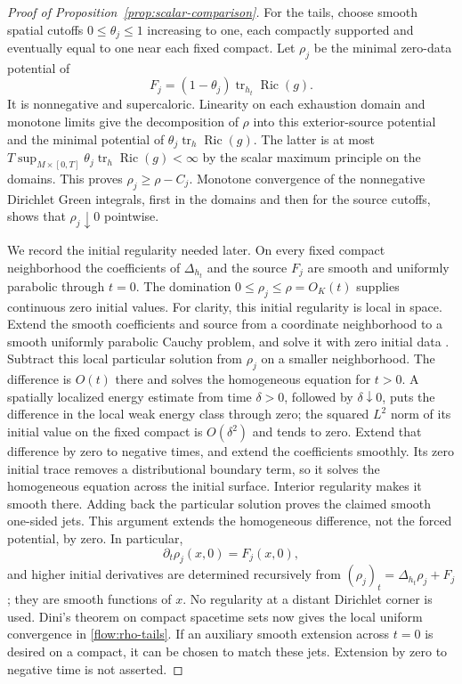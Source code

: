 \documentclass[11pt]{article}
\theoremstyle{definition}
\theoremstyle{remark}
\DeclareMathOperator{\Ric}{Ric}
\DeclareMathOperator{\tr}{tr}
\numberwithin{equation}{section}
\begin{document}
\begin{proof}[Proof of Proposition~\ref{prop:scalar-comparison}]
For the tails, choose smooth spatial cutoffs $0\le\theta_j\le1$
increasing to one, each compactly supported and eventually equal
to one near each fixed compact.  Let $\rho_j$ be the minimal
zero-data potential of
\[
 F_j=(1-\theta_j)\tr_{h_t}\Ric(g).
\]
It is nonnegative and supercaloric.  Linearity on each exhaustion
domain and monotone limits give the decomposition of $\rho$ into
this exterior-source potential and the minimal potential of
$\theta_j\tr_h\Ric(g)$.  The latter is at most
$T\sup_{M\times[0,T]}\theta_j\tr_h\Ric(g)<\infty$ by the scalar
maximum principle on the domains.  This proves
$\rho_j\ge\rho-C_j$.  Monotone convergence of the nonnegative
Dirichlet Green integrals, first in the domains and then for the
source cutoffs, shows that $\rho_j\downarrow0$ pointwise.

We record the initial regularity needed later.  On every fixed
compact neighborhood the coefficients of $\Delta_{h_t}$ and the
source $F_j$ are smooth and uniformly parabolic through $t=0$.
The domination $0\le\rho_j\le\rho=O_K(t)$ supplies continuous
zero initial values.
For clarity, this initial regularity is local in space.  Extend
the smooth coefficients and source from a coordinate neighborhood
to a smooth uniformly parabolic Cauchy problem, and solve it with
zero initial data \cite[Chapter~IV, Theorem~5.1]{LSU}.
Subtract this local particular solution from $\rho_j$ on a smaller
neighborhood.  The difference is $O(t)$ there and solves the
homogeneous equation for $t>0$.  A spatially localized energy
estimate from time $\delta>0$, followed by $\delta\downarrow0$,
puts the difference in the local weak energy class through zero;
the squared $L^2$ norm of its initial value on the fixed compact
is $O(\delta^2)$ and tends to zero.  Extend that difference by zero to
negative times, and extend the coefficients smoothly.  Its zero
initial trace removes a distributional boundary term, so it
solves the homogeneous equation across the initial surface.
Interior regularity \cite[Chapter~III, Theorem~12.1]{LSU} makes it
smooth there.  Adding back the particular solution proves the
claimed smooth one-sided jets.  This argument extends the
homogeneous difference, not the forced potential, by zero.
In particular,
\[
 \partial_t\rho_j(x,0)=F_j(x,0),
\]
and higher initial derivatives are determined recursively from
$(\rho_j)_t=\Delta_{h_t}\rho_j+F_j$; they are smooth functions of
$x$.  No regularity at a distant Dirichlet corner is used.  Dini's
theorem on compact spacetime sets now gives the local uniform
convergence in \eqref{flow:rho-tails}.  If an auxiliary smooth
extension across $t=0$ is desired on a compact, it can be chosen
to match these jets.  Extension by zero to negative time is not
asserted.


\end{proof}
\end{document}
